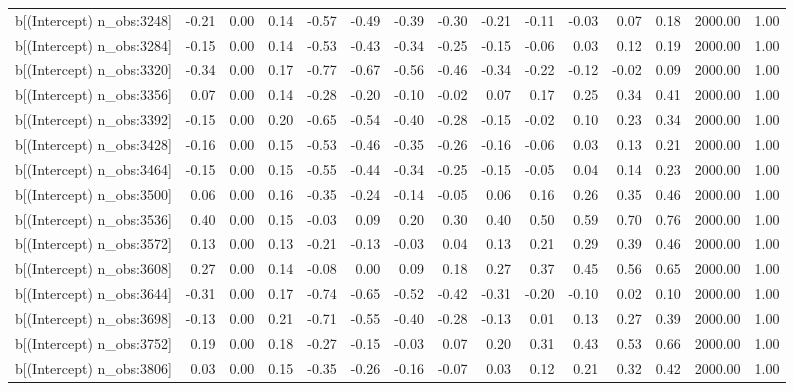 \begin{table}[ht]
\begin{tabular}{rrrrrrrrrrrrrrr}
  b[(Intercept) n\_obs:3248] & -0.21 & 0.00 & 0.14 & -0.57 & -0.49 & -0.39 & -0.30 & -0.21 & -0.11 & -0.03 & 0.07 & 0.18 & 2000.00 & 1.00 \\ 
  b[(Intercept) n\_obs:3284] & -0.15 & 0.00 & 0.14 & -0.53 & -0.43 & -0.34 & -0.25 & -0.15 & -0.06 & 0.03 & 0.12 & 0.19 & 2000.00 & 1.00 \\ 
  b[(Intercept) n\_obs:3320] & -0.34 & 0.00 & 0.17 & -0.77 & -0.67 & -0.56 & -0.46 & -0.34 & -0.22 & -0.12 & -0.02 & 0.09 & 2000.00 & 1.00 \\ 
  b[(Intercept) n\_obs:3356] & 0.07 & 0.00 & 0.14 & -0.28 & -0.20 & -0.10 & -0.02 & 0.07 & 0.17 & 0.25 & 0.34 & 0.41 & 2000.00 & 1.00 \\ 
  b[(Intercept) n\_obs:3392] & -0.15 & 0.00 & 0.20 & -0.65 & -0.54 & -0.40 & -0.28 & -0.15 & -0.02 & 0.10 & 0.23 & 0.34 & 2000.00 & 1.00 \\ 
  b[(Intercept) n\_obs:3428] & -0.16 & 0.00 & 0.15 & -0.53 & -0.46 & -0.35 & -0.26 & -0.16 & -0.06 & 0.03 & 0.13 & 0.21 & 2000.00 & 1.00 \\ 
  b[(Intercept) n\_obs:3464] & -0.15 & 0.00 & 0.15 & -0.55 & -0.44 & -0.34 & -0.25 & -0.15 & -0.05 & 0.04 & 0.14 & 0.23 & 2000.00 & 1.00 \\ 
  b[(Intercept) n\_obs:3500] & 0.06 & 0.00 & 0.16 & -0.35 & -0.24 & -0.14 & -0.05 & 0.06 & 0.16 & 0.26 & 0.35 & 0.46 & 2000.00 & 1.00 \\ 
  b[(Intercept) n\_obs:3536] & 0.40 & 0.00 & 0.15 & -0.03 & 0.09 & 0.20 & 0.30 & 0.40 & 0.50 & 0.59 & 0.70 & 0.76 & 2000.00 & 1.00 \\ 
  b[(Intercept) n\_obs:3572] & 0.13 & 0.00 & 0.13 & -0.21 & -0.13 & -0.03 & 0.04 & 0.13 & 0.21 & 0.29 & 0.39 & 0.46 & 2000.00 & 1.00 \\ 
  b[(Intercept) n\_obs:3608] & 0.27 & 0.00 & 0.14 & -0.08 & 0.00 & 0.09 & 0.18 & 0.27 & 0.37 & 0.45 & 0.56 & 0.65 & 2000.00 & 1.00 \\ 
  b[(Intercept) n\_obs:3644] & -0.31 & 0.00 & 0.17 & -0.74 & -0.65 & -0.52 & -0.42 & -0.31 & -0.20 & -0.10 & 0.02 & 0.10 & 2000.00 & 1.00 \\ 
  b[(Intercept) n\_obs:3698] & -0.13 & 0.00 & 0.21 & -0.71 & -0.55 & -0.40 & -0.28 & -0.13 & 0.01 & 0.13 & 0.27 & 0.39 & 2000.00 & 1.00 \\ 
  b[(Intercept) n\_obs:3752] & 0.19 & 0.00 & 0.18 & -0.27 & -0.15 & -0.03 & 0.07 & 0.20 & 0.31 & 0.43 & 0.53 & 0.66 & 2000.00 & 1.00 \\ 
  b[(Intercept) n\_obs:3806] & 0.03 & 0.00 & 0.15 & -0.35 & -0.26 & -0.16 & -0.07 & 0.03 & 0.12 & 0.21 & 0.32 & 0.42 & 2000.00 & 1.00 \\ 

\end{tabular}
\end{table}
